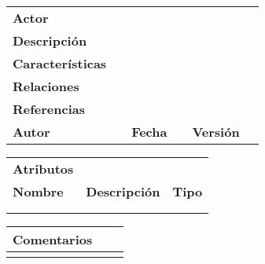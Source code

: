 \begin{table}[h]
\centering
\label{my-label}
\begin{tabular}{|l|lllll}
\cline{1-1} \cline{6-6}
\textbf{Actor}           & \textbf{}             & \textbf{}                           & \textbf{}             & \multicolumn{1}{l|}{\textbf{}}        & \multicolumn{1}{l|}{\textbf{}} \\ \cline{1-1} \cline{6-6} 
\textbf{Descripción}     &                       &                                     &                       &                                       & \textbf{}                      \\ \cline{1-1}
\textbf{Características} &                       &                                     &                       &                                       & \textbf{}                      \\ \cline{1-1}
\textbf{Relaciones}      &                       &                                     &                       &                                       & \textbf{}                      \\ \cline{1-1}
\textbf{Referencias}     &                       &                                     &                       &                                       & \textbf{}                      \\ \cline{1-1} \cline{3-3} \cline{5-5}
\textbf{Autor}           & \multicolumn{1}{l|}{} & \multicolumn{1}{l|}{\textbf{Fecha}} & \multicolumn{1}{l|}{} & \multicolumn{1}{l|}{\textbf{Versión}} & \textbf{}                      \\ \cline{1-1} \cline{3-3} \cline{5-5}
\end{tabular}
\end{table}

\begin{table}[h]
\centering
\label{my-label}
\begin{tabular}{lll}
\textbf{Atributos} & \textbf{}            &               \\
\textbf{Nombre}    & \textbf{Descripción} & \textbf{Tipo} \\
                   &                      &               \\
                   &                      &              
\end{tabular}
\end{table}

\begin{table}[h]
\centering
\begin{tabular}{lll}
\hline
\multicolumn{1}{|l}{Comentarios} &  & \multicolumn{1}{l|}{} \\ \hline
                                 &  &                      
\end{tabular}
\end{table}
